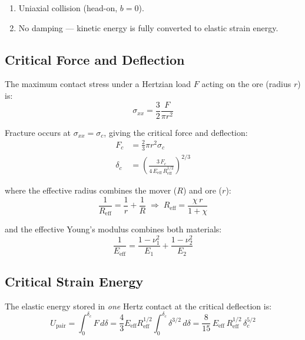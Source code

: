 \documentclass{article}
\begin{document}
\begin{enumerate}
    \item Uniaxial collision (head-on, $b = 0$).
    \item No damping — kinetic energy is fully converted to elastic strain energy.
\end{enumerate}

\subsection{Critical Force and Deflection}

The maximum contact stress under a Hertzian load $F$ acting on the ore (radius $r$) is:
\begin{equation}
    \sigma_{xx} = \frac{3}{2}\frac{F}{\pi r^2}
\end{equation}

Fracture occurs at $\sigma_{xx} = \sigma_c$, giving the critical force and deflection:
\begin{align}
    F_c &= \frac{2}{3}\pi r^2 \sigma_c \\[6pt]
    \delta_c &= \left(\frac{3\,F_c}{4\,E_{\text{eff}}\,R_{\text{eff}}^{1/2}}\right)^{2/3}
\end{align}

where the effective radius combines the mover ($R$) and ore ($r$):
\begin{equation}
    \frac{1}{R_{\text{eff}}} = \frac{1}{r} + \frac{1}{R}
    \;\Rightarrow\;
    R_{\text{eff}} = \frac{\chi\,r}{1+\chi}
\end{equation}

and the effective Young's modulus combines both materials:
\begin{equation}
    \frac{1}{E_{\text{eff}}} = \frac{1-\nu_1^2}{E_1} + \frac{1-\nu_2^2}{E_2}
\end{equation}

\subsection{Critical Strain Energy}

The elastic energy stored in \emph{one} Hertz contact at the critical deflection is:
\begin{equation}
    U_{\text{pair}} = \int_0^{\delta_c} F\,d\delta
    = \frac{4}{3}E_{\text{eff}}R_{\text{eff}}^{1/2}
      \int_0^{\delta_c}\delta^{3/2}\,d\delta
    = \frac{8}{15}\,E_{\text{eff}}\,R_{\text{eff}}^{1/2}\,\delta_c^{5/2}
\end{equation}
\end{document}
